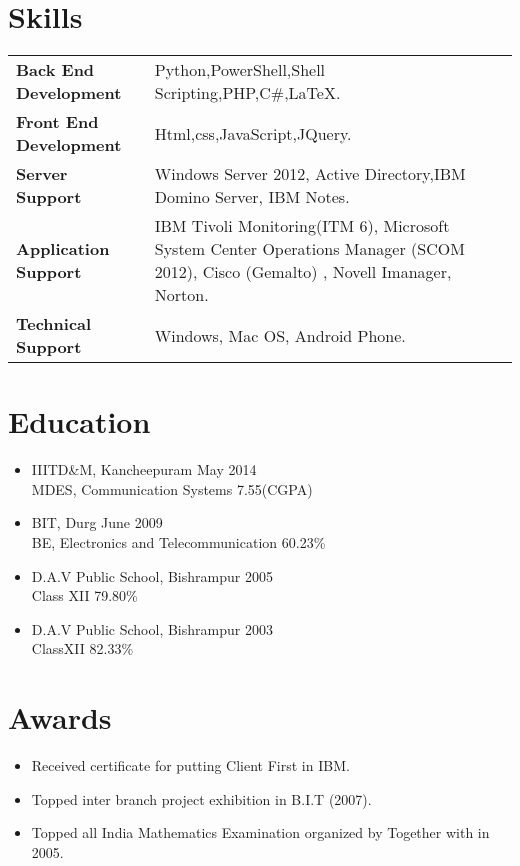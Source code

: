 \documentclass[letterpaper, 12pt]{article}
\begin{document}
			\begin{minipage}{0.45\textwidth}
\section*{Skills}
\begin{tabular}{m{} m{}} 
	\textbf{Back End Development} & Python,PowerShell,Shell Scripting,PHP,C\#,\LaTeX.  \\ 
	\textbf{Front End Development} & Html,css,JavaScript,JQuery. \\
	\textbf{Server Support} & Windows Server 2012, Active Directory,IBM Domino Server, IBM Notes. \\
	\textbf{Application Support} & IBM Tivoli Monitoring(ITM 6), Microsoft System Center Operations Manager (SCOM 2012), Cisco (Gemalto) , Novell Imanager, Norton. \\ 
	\textbf{Technical Support} & Windows, Mac OS, Android Phone. \\ 
\end{tabular}		


			\section{Education}
			\begin{itemize}[noitemsep]
				\item {{IIITD\&M, Kancheepuram} \hfill {May 2014}\\{MDES, Communication Systems} \hfill {7.55(CGPA)}} 
				\item {BIT, Durg} \hfill {June 2009}\\{BE, Electronics and Telecommunication} \hfill {60.23\%}
				\item  {{D.A.V Public School, Bishrampur} \hfill {2005}\\{Class XII} \hfill {79.80\%}}
				\item {{D.A.V Public School, Bishrampur} \hfill {2003}\\ {ClassXII} \hfill {82.33\%}}
			\end{itemize}		
			
		\section{Awards}
		\begin{itemize}[noitemsep]
			\item {Received certificate for putting Client First in IBM.}
			\item {Topped inter branch project exhibition in B.I.T (2007).}
			\item {Topped all India Mathematics Examination organized by Together with in 2005.}
		\end{itemize}
		
	\end{minipage}	
		
		
		
		
		
		
		
					
\end{document}
